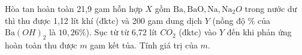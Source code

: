 \begin{vd}
	Hòa tan hoàn toàn 21,9 gam hỗn hợp $X$ gồm $\mathrm{Ba}, \mathrm{BaO}, \mathrm{Na}, \mathrm{Na}_2 O$ trong nước dư thì thu được 1,12 lít khí (đktc) và 200 gam dung dịch $Y$ (nồng độ $\%$ của $\mathrm{Ba}(OH)_2$ là $10,26\%$). Sục từ từ 6,72 lít $CO_2$ (đktc) vào $Y$ đến khi phản ứng hoàn toàn thu được $m$ gam kết tủa. Tính giá trị của $m$.
	\loigiai{
}
\end{vd}
